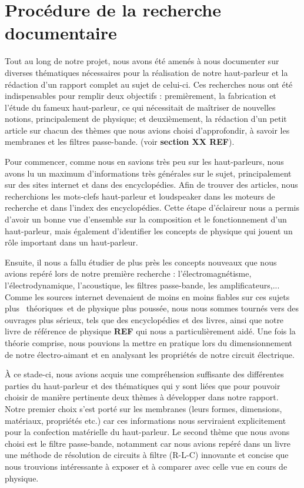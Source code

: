 \documentclass[a4paper, 11pt]{article}
\begin{document}
\section{Procédure de la recherche documentaire} 

Tout au long de notre projet, nous avons été amenés à nous documenter sur diverses thématiques nécessaires pour la réalisation de notre haut-parleur et la rédaction d'un rapport complet au sujet de celui-ci.
Ces recherches nous ont été indispensables pour remplir deux objectifs : premièrement, la fabrication et l'étude du fameux haut-parleur, ce qui nécessitait de maîtriser de nouvelles notions, principalement de physique; et deuxièmement, la rédaction d'un petit \og article \fg sur chacun des thèmes que nous avions choisi d'approfondir, à savoir les membranes et les filtres passe-bande. (voir \textbf{section XX REF}). %
\newline

Pour commencer, comme nous en savions très peu sur les haut-parleurs, nous avons lu un maximum d’informations très générales sur le sujet, principalement sur des sites internet et dans des encyclopédies. Afin de trouver des articles, nous recherchions les mots-clefs \og haut-parleur \fg et \og loudspeaker \fg dans les moteurs de recherche et dans l'index des encyclopédies. 
Cette étape \og d'éclaireur \fg nous a permis d'avoir un bonne vue d’ensemble sur la composition et le fonctionnement d’un haut-parleur, mais également d'identifier les concepts de physique qui jouent un rôle important dans un haut-parleur.  


Ensuite, il nous a fallu étudier de plus près les concepts nouveaux que nous avions repéré lors de notre première recherche : l'électromagnétisme, l'électrodynamique, l’acoustique, les filtres passe-bande, les amplificateurs,... Comme les sources internet devenaient de moins en moins fiables sur ces sujets plus \og théoriques \fg et de physique plus poussée, nous nous sommes tournés vers des ouvrages plus sérieux, tels que des encyclopédies et des livres, ainsi que notre livre de référence de physique \textbf{REF} %
qui nous a particulièrement aidé. Une fois la théorie comprise, nous pouvions la mettre en pratique lors du dimensionnement de notre électro-aimant et en analysant les propriétés de notre circuit électrique. 
\newline

À ce stade-ci, nous avions acquis une compréhension suffisante des différentes parties du haut-parleur et des thématiques qui y sont liées que pour pouvoir choisir de manière pertinente deux thèmes à développer dans notre rapport. Notre premier choix s'est  porté sur les membranes (leurs formes, dimensions, matériaux, propriétés etc.) car ces informations nous serviraient explicitement pour la confection matérielle du haut-parleur. Le second thème que nous avons choisi est le filtre passe-bande, notamment car nous avions repéré dans un livre une méthode de résolution de circuits à filtre (R-L-C) innovante et concise que nous trouvions intéressante à exposer et à comparer avec celle vue en cours de physique. 
\end{document}
